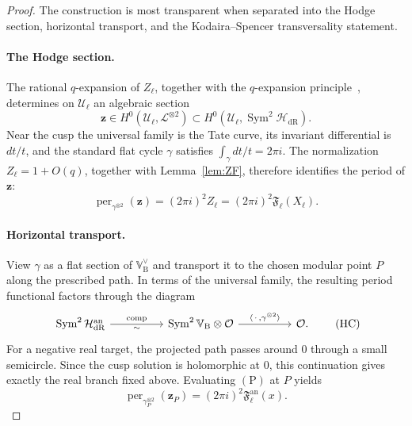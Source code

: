 \documentclass[11pt,a4paper]{amsart} %
\theoremstyle{definition}
\newcommand{\Sym}{\operatorname{Sym}}
\newcommand{\dR}{\mathrm{dR}}
\newcommand{\Betti}{\mathrm B}
\begin{document}
\begin{proof}
The construction is most transparent when separated into the Hodge section,
horizontal transport, and the Kodaira--Spencer transversality statement.

\paragraph{The Hodge section.}
The rational \(q\)-expansion of \(Z_\ell\), together with the
\(q\)-expansion principle~\cite{Katz}, determines on \(\mathcal U_\ell\) an
algebraic section
\[
\mathbf z\in
H^0(\mathcal U_\ell,\mathcal L^{\otimes2})
\subset H^0(\mathcal U_\ell,\Sym^2\mathcal H_{\dR}).
\]
Near the cusp the universal family is the Tate curve, its invariant
differential is \(dt/t\), and the standard flat cycle \(\gamma\) satisfies
\(\int_\gamma dt/t=2\pi i\). The normalization \(Z_\ell=1+O(q)\), together
with Lemma~\ref{lem:ZF}, therefore identifies the period of \(\mathbf z\):
\[
\operatorname{per}_{\gamma^{\otimes2}}(\mathbf z)
=(2\pi i)^2Z_\ell
=(2\pi i)^2{\mathfrak F}_\ell(X_\ell).
\tag{P}
\]

\paragraph{Horizontal transport.}
View \(\gamma\) as a flat section of \(\mathbb V_{\Betti}^\vee\) and
transport it to the chosen modular point \(P\) along the prescribed path.
In terms of the universal family, the resulting period functional factors
through the diagram
\[
\begin{tikzcd}[column sep=huge]
\Sym^2\mathcal H_{\dR}^{\mathrm{an}}
  \arrow[r,"\operatorname{comp}","\sim"']
& \Sym^2\mathbb V_{\Betti}\otimes\mathcal O
  \arrow[r,"{\langle\,\cdot\,,\gamma^{\otimes2}\rangle}"]
& \mathcal O .
\end{tikzcd}
\tag{HC}
\]
For a negative real target, the projected path passes around \(0\) through a
small semicircle. Since the cusp solution is holomorphic at \(0\), this
continuation gives exactly the real branch fixed above. Evaluating \((\mathrm P)\) at
\(P\) yields
\[
\operatorname{per}_{\gamma_P^{\otimes2}}(\mathbf z_P)
=(2\pi i)^2{\mathfrak F}^{\mathrm{an}}_\ell(x).
\]


\end{proof}
\end{document}
